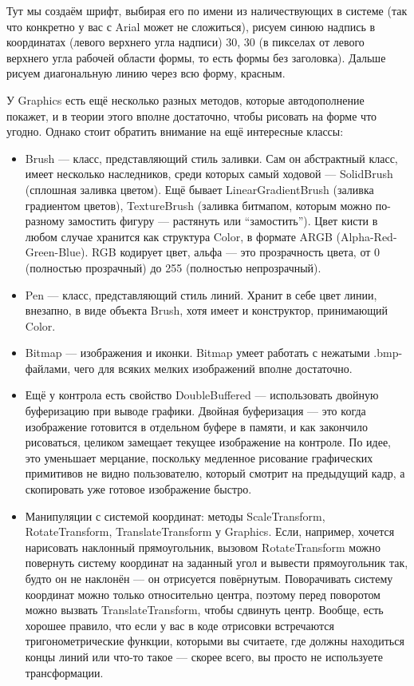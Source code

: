 \documentclass{../../text-style}
\begin{document}
Тут мы создаём шрифт, выбирая его по имени из наличествующих в системе (так что конкретно у вас с Arial может не сложиться), рисуем синюю надпись в координатах (левого верхнего угла надписи) 30, 30 (в пикселах от левого верхнего угла рабочей области формы, то есть формы без заголовка).
Дальше рисуем диагональную линию через всю форму, красным.

У Graphics есть ещё несколько разных методов, которые автодополнение покажет, и в теории этого вполне достаточно, чтобы рисовать на форме что угодно.
Однако стоит обратить внимание на ещё интересные классы:

\begin{itemize}
    \item Brush --- класс, представляющий стиль заливки.
        Сам он абстрактный класс, имеет несколько наследников, среди которых самый ходовой --- SolidBrush (сплошная заливка цветом). 
        Ещё бывает LinearGradientBrush (заливка градиентом цветов), TextureBrush (заливка битмапом, которым можно по-разному замостить фигуру --- растянуть или \enquote{замостить}).
        Цвет кисти в любом случае хранится как структура Color, в формате ARGB (Alpha-Red-Green-Blue).
        RGB кодирует цвет, альфа --- это прозрачность цвета, от 0 (полностью прозрачный) до 255 (полностью непрозрачный).
    \item Pen --- класс, представляющий стиль линий.
        Хранит в себе цвет линии, внезапно, в виде объекта Brush, хотя имеет и конструктор, принимающий Color.
    \item Bitmap --- изображения и иконки.
        Bitmap умеет работать с нежатыми .bmp-файлами, чего для всяких мелких изображений вполне достаточно.
    \item Ещё у контрола есть свойство DoubleBuffered --- использовать двойную буферизацию при выводе графики.
        Двойная буферизация --- это когда изображение готовится в отдельном буфере в памяти, и как закончило рисоваться, целиком замещает текущее изображение на контроле.
        По идее, это уменьшает мерцание, поскольку медленное рисование графических примитивов не видно пользователю, который смотрит на предыдущий кадр, а скопировать уже готовое изображение быстро.
    \item Манипуляции с системой координат: методы ScaleTransform, RotateTransform, TranslateTransform у Graphics. 
        Если, например, хочется нарисовать наклонный прямоугольник, вызовом RotateTransform можно повернуть систему координат на заданный угол и вывести прямоугольник так, будто он не наклонён --- он отрисуется повёрнутым. 
        Поворачивать систему координат можно только относительно центра, поэтому перед поворотом можно вызвать TranslateTransform, чтобы сдвинуть центр.
        Вообще, есть хорошее правило, что если у вас в коде отрисовки встречаются тригонометрические функции, которыми вы считаете, где должны находиться концы линий или что-то такое --- скорее всего, вы просто не используете трансформации.
\end{itemize}
\end{document}
